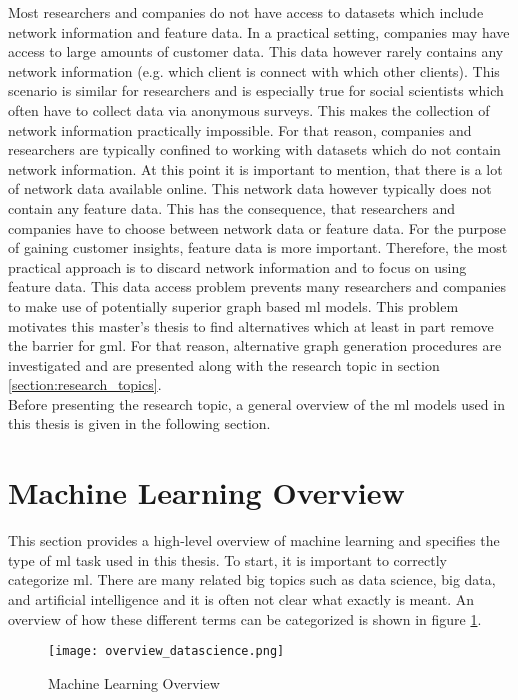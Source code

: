 	\noindent Most researchers and companies do not have access to datasets which
	include network information and feature data. In a practical setting,
	companies may have access to large amounts of customer data. This data
	however rarely contains any network information (e.g. which client is
	connect with which other clients). This scenario is similar for researchers
	and is especially true for social scientists which often have to collect 
	data via anonymous surveys. This makes the collection of network information 
	practically impossible. For that reason, companies and researchers are 
	typically confined to working with datasets which do not contain network 
	information. At this point it is important to mention, that there is a lot 
	of network data available online. This network data however typically does 
	not contain any feature data. This has the consequence, that researchers and 
	companies have to choose between network data or feature data. For the 
	purpose of gaining customer insights, feature data is more important. 
	Therefore, the most practical approach is to discard network information 
	and to focus on using feature data. This data access problem prevents many 
	researchers and companies to make use of potentially superior graph based 
	\acs{ml} models. This problem motivates this master's thesis to find
	alternatives which at least in part remove the barrier for \acs{gml}. For 
	that reason, alternative graph generation procedures are investigated and 
	are presented along with the research topic in section 
	\ref{section:research_topics}. \\

	\noindent Before presenting the research topic, a general overview of the 
	\acs{ml} models used in this thesis is given in the following section.
	
	\section{Machine Learning Overview}

	This section provides a high-level overview of machine learning and
	specifies the type of \acs{ml} task used in this thesis. To start, it is 
	important to correctly categorize \acs{ml}. There are many related 
	big topics such as data science, big data, and artificial intelligence and 
	it is often not clear what exactly is meant. An overview of how these 
	different terms can be categorized is shown in figure \ref{fig:ml_overview}.

	\begin{figure}[H]
		\centering
		\texttt{[image: overview\_datascience.png]}
		\caption{Machine Learning Overview}
		\citep{Frauenhofer2021}
		\label{fig:ml_overview}
	\end{figure} 

